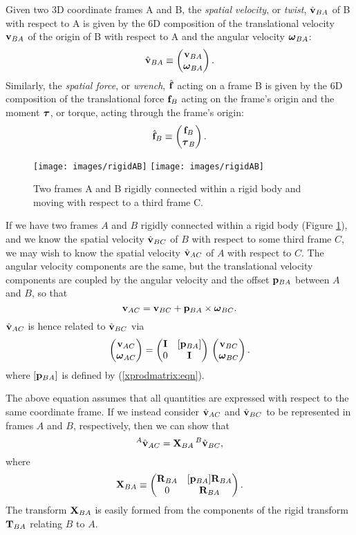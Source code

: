 Given two 3D coordinate frames A and B, the {\it spatial velocity},
or {\it twist},
$\hat{{\bf v}}_{BA}$ of B with respect to A is given by the 6D 
composition of the translational velocity ${\bf v}_{BA}$ of the
origin of B with respect to A and the angular velocity $\boldsymbol\omega_{BA}$:
%
\begin{equation}
\hat{{\bf v}}_{BA} \equiv \left(\begin{matrix} {\bf v}_{BA} \\ \boldsymbol\omega_{BA} \end{matrix}\right).
\end{equation}
%
Similarly, the {\it spatial force}, or {\it wrench}, $\hat{{\bf f}}$ acting
on a frame B is given by the 6D composition of the translational force
${\bf f}_B$ acting on the frame's origin and the moment $\boldsymbol\tau$, or torque,
acting through the frame's origin:
%
\begin{equation}
\hat{{\bf f}}_B \equiv \left(\begin{matrix} {\bf f}_B \\ \boldsymbol\tau_B \end{matrix}\right).
\end{equation}
%

\begin{figure}[ht]
\begin{center}
 \iflatexml
   \texttt{[image: images/rigidAB]}
 \else
   \texttt{[image: images/rigidAB]}
 \fi
\end{center}
\caption{Two frames A and B rigidly connected within a rigid body
and moving with respect to a third frame C.}
\label{rigidAB:fig}
\end{figure}

If we have two frames $A$ and $B$ rigidly connected within a rigid
body (Figure \ref{rigidAB:fig}), and we know the spatial velocity
$\hat{{\bf v}}_{BC}$ of $B$ with respect to some third frame $C$, we may wish
to know the spatial velocity $\hat{{\bf v}}_{AC}$ of $A$ with respect to $C$.
The angular velocity components are the same, but the translational
velocity components are coupled by the angular velocity and the offset
${\bf p}_{BA}$ between $A$ and $B$, so that
%
\begin{equation*}
{\bf v}_{AC} = {\bf v}_{BC} + {\bf p}_{BA} \times \boldsymbol\omega_{BC}.
\end{equation*}
%
$\hat{{\bf v}}_{AC}$ is hence related to $\hat{{\bf v}}_{BC}$ via
\begin{equation*}
\left(\begin{matrix} {\bf v}_{AC} \\ \boldsymbol\omega_{AC} \end{matrix}\right) =
\left(\begin{matrix} {\bf I} & [{\bf p}_{BA}] \\ 0 & {\bf I} \end{matrix}\right) \,
\left(\begin{matrix} {\bf v}_{BC} \\ \boldsymbol\omega_{BC} \end{matrix}\right).
\end{equation*}
%
where $[{\bf p}_{BA}]$ is defined by
(\ref{xprodmatrix:eqn}).

The above equation assumes that all quantities are expressed
with respect to the same coordinate frame.
If we instead consider $\hat{{\bf v}}_{AC}$ and $\hat{{\bf v}}_{BC}$ to be represented
in frames $A$ and $B$, respectively, then
we can show that
%
\begin{equation}
{}^A\hat{{\bf v}}_{AC} = {\bf X}_{BA} \, {}^B\hat{{\bf v}}_{BC},
\end{equation}
%
where
%
\begin{equation}
{\bf X}_{BA} \equiv
\left(\begin{matrix} {\bf R}_{BA} & [{\bf p}_{BA}] {\bf R}_{BA} \\ 0 & {\bf R}_{BA} \end{matrix}\right).
\label{XvelAB:eqn}
\end{equation}
%
The transform ${\bf X}_{BA}$ is easily formed from the components of the
rigid transform ${\bf T}_{BA}$ relating $B$ to $A$.

